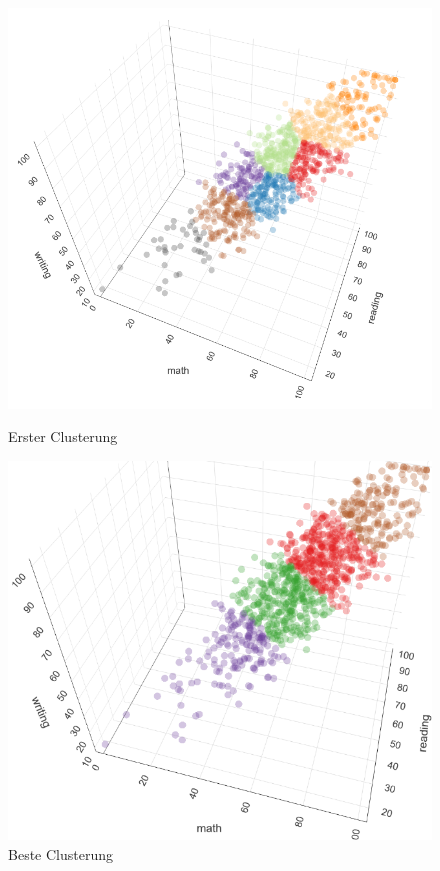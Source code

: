 \documentclass[
	handout,
  	aspectratio=169
]{beamer}
\begin{document}
	\begin{frame}
	\begin{figure}[!htb]
\includegraphics[scale=0.45]{../pictures/cluster.png}
			 \caption{Erster Clusterung}
		\endminipage\hfill
			\includegraphics[scale=0.5]{../pictures/best_cluster.png}
			 \caption{Beste Clusterung}
		\endminipage\hfill
	\end{figure}
	\end{frame}
\end{document}
